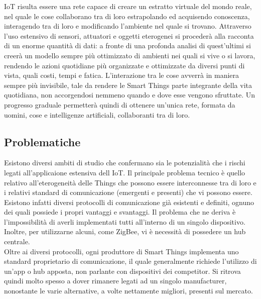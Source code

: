 \documentclass[12pt,a4paper,openright,oneside]{report}
\begin{document}
IoT risulta essere una rete capace di creare un estratto virtuale del mondo reale, nel quale le cose collaborano tra di loro estrapolando ed acquisendo conoscenza, interagendo tra di loro e modificando l'ambiente nel quale si trovano. Attraverso l'uso estensivo di sensori, attuatori e oggetti eterogenei si procederà alla racconta di un enorme quantità di dati: a fronte di una profonda analisi di quest'ultimi si creerà un modello sempre più ottimizzato di ambienti nei quali si vive o si lavora, rendendo le azioni quotidiane più organizzate e ottimizzate da diversi punti di vista, quali costi, tempi e fatica. L'interazione tra le cose avverrà in maniera sempre più invisibile, tale da rendere le Smart Things parte integrante della vita quotidiana, non accorgendosi nemmeno quando e dove esse vengono sfruttate. Un progresso graduale permetterà quindi di ottenere un'unica rete, formata da uomini, cose e intelligenze artificiali, collaboranti tra di loro.

\subsection{Problematiche}
Esistono diversi ambiti di studio che confermano sia le potenzialità che i rischi legati all'applicaione estensiva dell IoT. Il principale problema tecnico è quello relativo all'eterogeneità delle Things che possono essere interconnesse tra di loro e i relativi standard di comunicazione (emergenti e presenti) che vi possono essere. Esistono infatti diversi protocolli di comunicazione già esistenti e definiti, ognuno dei quali possiede i propri vantaggi e svantaggi. Il problema che ne deriva è l'impossibilità di averli implementati tutti all'interno di un singolo dispositivo. Inoltre, per utilizzarne alcuni, come ZigBee, vi è necessità di possedere un hub centrale.\\

Oltre ai diversi protocolli, ogni produttore di Smart Things implementa uno standard proprietario di comunicazione, il quale generalmente richiede l'utilizzo di un'app o hub apposta, non parlante con dispositivi dei competitor. Si ritrova quindi molto spesso a dover rimanere legati ad un singolo manufacturer, nonostante le varie alternative, a volte nettamente migliori, presenti sul mercato.\\
\end{document}
